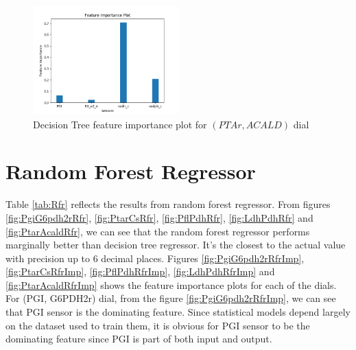 \documentclass[12pt,chapterheads]{ucsd}
\begin{document}
\begin{figure}[h] 
\centering
\includegraphics[width=0.5\textwidth]{Figures/PTAr_ACALD_dtr_important_features}
\caption[Decision Tree feature importance plot for $(PTAr, ACALD)$ dial]
{Decision Tree feature importance plot for $(PTAr, ACALD)$ dial}
\label{fig:PtarAcaldDtrImp}
\end{figure}

\section{Random Forest Regressor}\label{sec:rfrRes}
Table \ref{tab:Rfr} reflects the results from random forest regressor.
From figures \ref{fig:PgiG6pdh2rRfr}, \ref{fig:PtarCsRfr}, \ref{fig:PflPdhRfr}, \ref{fig:LdhPdhRfr} and \ref{fig:PtarAcaldRfr}, we can see that the random forest regressor performs marginally better than decision tree regressor. It's the closest to the actual value with precision up to 6 decimal places.
Figures \ref{fig:PgiG6pdh2rRfrImp}, \ref{fig:PtarCsRfrImp}, \ref{fig:PflPdhRfrImp}, \ref{fig:LdhPdhRfrImp} and \ref{fig:PtarAcaldRfrImp} shows the feature importance plots for each of the dials.\\
For \string(PGI, G6PDH2r) dial, from the figure \ref{fig:PgiG6pdh2rRfrImp}, we can see that PGI sensor is the dominating feature. Since statistical models depend largely on the dataset used to train them, it is obvious for PGI sensor to be the dominating feature since PGI is part of both input and output.\\ 
\end{document}
